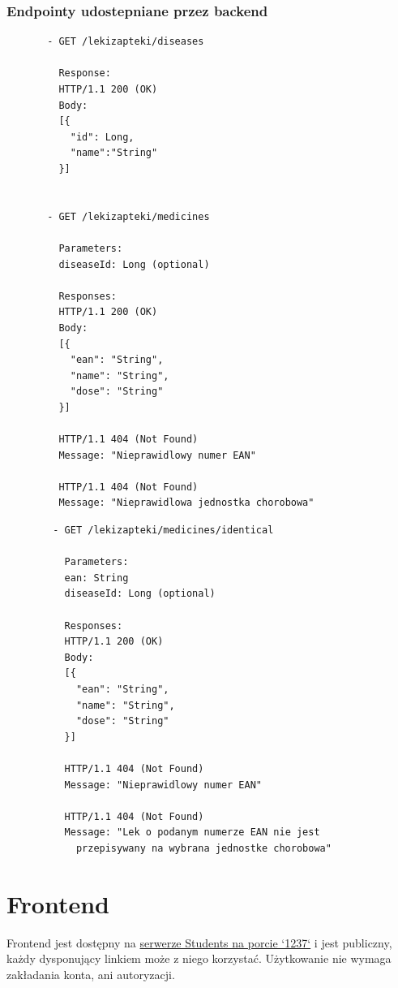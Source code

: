 \documentclass{article}
\begin{document}
    \subsubsection{Endpointy udostepniane przez backend}
    \noindent
    \begin{minipage}{.45\textwidth}
     \begin{lstlisting}
       - GET /lekizapteki/diseases

         Response:
         HTTP/1.1 200 (OK)
         Body:
         [{
           "id": Long,
           "name":"String"
         }]


       - GET /lekizapteki/medicines

         Parameters:
         diseaseId: Long (optional)

         Responses:
         HTTP/1.1 200 (OK)
         Body:
         [{
           "ean": "String",
           "name": "String",
           "dose": "String"
         }]

         HTTP/1.1 404 (Not Found)
         Message: "Nieprawidlowy numer EAN"

         HTTP/1.1 404 (Not Found)
         Message: "Nieprawidlowa jednostka chorobowa"
     \end{lstlisting}
    \end{minipage}\hfill
    \begin{minipage}{.45\textwidth}
      \begin{lstlisting}
        - GET /lekizapteki/medicines/identical

          Parameters:
          ean: String
          diseaseId: Long (optional)

          Responses:
          HTTP/1.1 200 (OK)
          Body:
          [{
            "ean": "String",
            "name": "String",
            "dose": "String"
          }]

          HTTP/1.1 404 (Not Found)
          Message: "Nieprawidlowy numer EAN"

          HTTP/1.1 404 (Not Found)
          Message: "Lek o podanym numerze EAN nie jest
            przepisywany na wybrana jednostke chorobowa"
      \end{lstlisting}
    \end{minipage}

  \section{Frontend}
  Frontend jest dostępny na
  \href{http://students.mimuw.edu.pl:1237}{serwerze Students na porcie `1237`} i jest publiczny,
  każdy dysponujący linkiem może z niego korzystać.
  Użytkowanie nie wymaga zakładania konta, ani autoryzacji.
\end{document}
